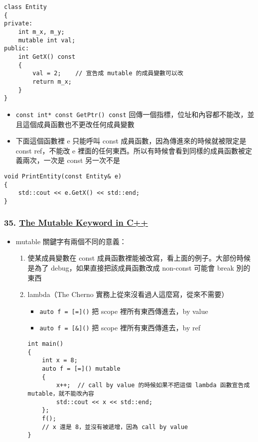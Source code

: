 \documentclass[11pt]{article}
\providecommand{\tightlist}{%
      \setlength{\itemsep}{0pt}\setlength{\parskip}{0pt}}
\begin{document}
\begin{verbatim}
class Entity
{
private:
    int m_x, m_y;
    mutable int val;
public: 
    int GetX() const
    {
        val = 2;    // 宣告成 mutable 的成員變數可以改
        return m_x;
    }
}
\end{verbatim}

\begin{itemize}
\tightlist
\item
  \texttt{const\ int*\ const\ GetPtr()\ const}
  回傳一個指標，位址和內容都不能改，並且這個成員函數也不更改任何成員變數
\item
  下面這個函數裡 e 只能呼叫 const 成員函數，因為傳進來的時候就被限定是
  const ref，不能改 e
  裡面的任何東西。所以有時候會看到同樣的成員函數被定義兩次，一次是 const
  另一次不是
\end{itemize}

\begin{verbatim}
void PrintEntity(const Entity& e)
{
    std::cout << e.GetX() << std::end;
}
\end{verbatim}

\hypertarget{the-mutable-keyword-in-c}{%
\subsubsection{\texorpdfstring{35.
\href{https://www.youtube.com/watch?v=bP9z3H3cVMY\&list=PLlrATfBNZ98dudnM48yfGUldqGD0S4FFb\&index=35}{The
Mutable Keyword in
C++}}{35. The Mutable Keyword in C++}}\label{the-mutable-keyword-in-c}}

\begin{itemize}
\tightlist
\item
  mutable 關鍵字有兩個不同的意義：

  \begin{enumerate}
  \def\labelenumi{\arabic{enumi}.}
  \tightlist
  \item
    使某成員變數在 const
    成員函數裡能被改寫，看上面的例子。大部份時候是為了
    debug，如果直接把該成員函數改成 non-const 可能會 break 別的東西
  \item
    lambda（The Cherno 實務上從來沒看過人這麼寫，從來不需要）

    \begin{itemize}
    \tightlist
    \item
      \texttt{auto\ f\ =\ {[}={]}()} 把 scope 裡所有東西傳進去，by value
    \item
      \texttt{auto\ f\ =\ {[}\&{]}()} 把 scope 裡所有東西傳進去，by ref
    \end{itemize}

\begin{verbatim}
int main()
{
    int x = 8;
    auto f = [=]() mutable
    {
        x++;  // call by value 的時候如果不把這個 lambda 函數宣告成 mutable，就不能改內容
        std::cout << x << std::end;
    };
    f();
    // x 還是 8，並沒有被遞增，因為 call by value
}     
\end{verbatim}
  \end{enumerate}
\end{itemize}
\end{document}
